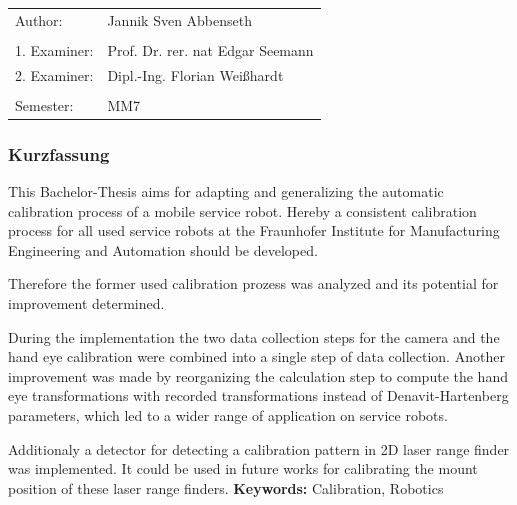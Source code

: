 \begin{tabular}{ll}

  Author:&Jannik Sven Abbenseth\\\\
  1. Examiner:&Prof. Dr. rer. nat Edgar Seemann\\
  2. Examiner:&Dipl.-Ing. Florian Weißhardt \\\\
  Semester:& MM7
\end{tabular}
\subsubsection{Kurzfassung}
\label{ssub:Kurzfassung}

This Bachelor-Thesis aims for adapting and generalizing the automatic 
calibration process of a mobile service robot.
Hereby a consistent calibration process for all used service robots at the
Fraunhofer Institute for Manufacturing Engineering and Automation should be developed.

Therefore the former used calibration prozess was analyzed and its potential for
improvement determined.

During the implementation the two data collection steps for the camera and the
hand eye calibration were combined into a single step of data collection.
Another improvement was made by reorganizing the calculation step to compute 
the hand eye transformations with recorded transformations instead of Denavit-Hartenberg
parameters, which led to a wider range of application on service robots.

Additionaly a detector for detecting a calibration pattern in 2D laser range finder
was implemented. It could be used in future works for calibrating the mount position
of these laser range finders.
\vfill
\textbf{Keywords: }Calibration, Robotics



\tableofcontents

\listoffigures



%
%
